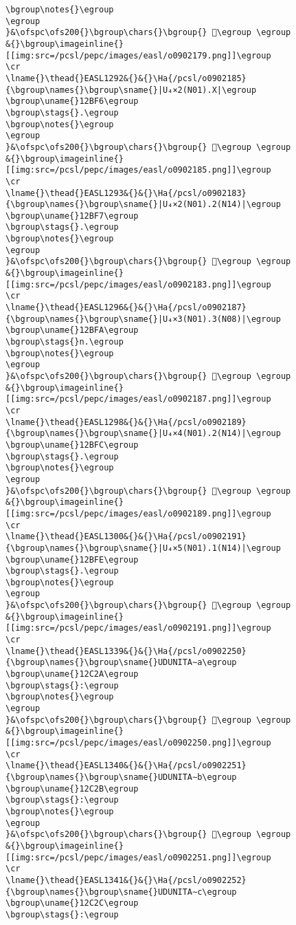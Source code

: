 \begin{verbatim}
\bgroup\notes{}\egroup
\egroup
}&\ofspc\ofs200{}\bgroup\chars{}\bgroup{} 𒯴\egroup \egroup
&{}\bgroup\imageinline{}[[img:src=/pcsl/pepc/images/easl/o0902179.png]]\egroup
\cr
\lname{}\thead{}EASL1292&{}&{}\Ha{/pcsl/o0902185}{\bgroup\names{}\bgroup\sname{}|U₄×2(N01).X|\egroup
\bgroup\uname{}12BF6\egroup
\bgroup\stags{}.\egroup
\bgroup\notes{}\egroup
\egroup
}&\ofspc\ofs200{}\bgroup\chars{}\bgroup{} 𒯶\egroup \egroup
&{}\bgroup\imageinline{}[[img:src=/pcsl/pepc/images/easl/o0902185.png]]\egroup
\cr
\lname{}\thead{}EASL1293&{}&{}\Ha{/pcsl/o0902183}{\bgroup\names{}\bgroup\sname{}|U₄×2(N01).2(N14)|\egroup
\bgroup\uname{}12BF7\egroup
\bgroup\stags{}.\egroup
\bgroup\notes{}\egroup
\egroup
}&\ofspc\ofs200{}\bgroup\chars{}\bgroup{} 𒯷\egroup \egroup
&{}\bgroup\imageinline{}[[img:src=/pcsl/pepc/images/easl/o0902183.png]]\egroup
\cr
\lname{}\thead{}EASL1296&{}&{}\Ha{/pcsl/o0902187}{\bgroup\names{}\bgroup\sname{}|U₄×3(N01).3(N08)|\egroup
\bgroup\uname{}12BFA\egroup
\bgroup\stags{}n.\egroup
\bgroup\notes{}\egroup
\egroup
}&\ofspc\ofs200{}\bgroup\chars{}\bgroup{} 𒯺\egroup \egroup
&{}\bgroup\imageinline{}[[img:src=/pcsl/pepc/images/easl/o0902187.png]]\egroup
\cr
\lname{}\thead{}EASL1298&{}&{}\Ha{/pcsl/o0902189}{\bgroup\names{}\bgroup\sname{}|U₄×4(N01).2(N14)|\egroup
\bgroup\uname{}12BFC\egroup
\bgroup\stags{}.\egroup
\bgroup\notes{}\egroup
\egroup
}&\ofspc\ofs200{}\bgroup\chars{}\bgroup{} 𒯼\egroup \egroup
&{}\bgroup\imageinline{}[[img:src=/pcsl/pepc/images/easl/o0902189.png]]\egroup
\cr
\lname{}\thead{}EASL1300&{}&{}\Ha{/pcsl/o0902191}{\bgroup\names{}\bgroup\sname{}|U₄×5(N01).1(N14)|\egroup
\bgroup\uname{}12BFE\egroup
\bgroup\stags{}.\egroup
\bgroup\notes{}\egroup
\egroup
}&\ofspc\ofs200{}\bgroup\chars{}\bgroup{} 𒯾\egroup \egroup
&{}\bgroup\imageinline{}[[img:src=/pcsl/pepc/images/easl/o0902191.png]]\egroup
\cr
\lname{}\thead{}EASL1339&{}&{}\Ha{/pcsl/o0902250}{\bgroup\names{}\bgroup\sname{}UDUNITA∼a\egroup
\bgroup\uname{}12C2A\egroup
\bgroup\stags{}:\egroup
\bgroup\notes{}\egroup
\egroup
}&\ofspc\ofs200{}\bgroup\chars{}\bgroup{} 𒰪\egroup \egroup
&{}\bgroup\imageinline{}[[img:src=/pcsl/pepc/images/easl/o0902250.png]]\egroup
\cr
\lname{}\thead{}EASL1340&{}&{}\Ha{/pcsl/o0902251}{\bgroup\names{}\bgroup\sname{}UDUNITA∼b\egroup
\bgroup\uname{}12C2B\egroup
\bgroup\stags{}:\egroup
\bgroup\notes{}\egroup
\egroup
}&\ofspc\ofs200{}\bgroup\chars{}\bgroup{} 𒰫\egroup \egroup
&{}\bgroup\imageinline{}[[img:src=/pcsl/pepc/images/easl/o0902251.png]]\egroup
\cr
\lname{}\thead{}EASL1341&{}&{}\Ha{/pcsl/o0902252}{\bgroup\names{}\bgroup\sname{}UDUNITA∼c\egroup
\bgroup\uname{}12C2C\egroup
\bgroup\stags{}:\egroup

\end{verbatim}

